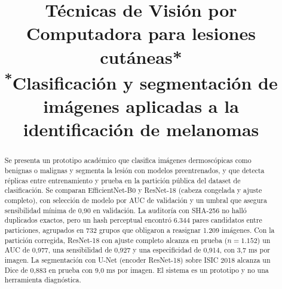 \documentclass[conference]{IEEEtran}
\begin{document}
	
	\title{Técnicas de Visión por Computadora para lesiones cutáneas*\\
		{\footnotesize \textsuperscript{*}Clasificación y segmentación de imágenes aplicadas a la identificación de melanomas}}
	
	\author{
		\and
		\and
		\and
	}
	
	\maketitle
	
	\begin{abstract}
		Se presenta un prototipo académico que clasifica imágenes dermoscópicas como benignas o malignas y segmenta la lesión con modelos preentrenados, y que detecta réplicas entre entrenamiento y prueba en la partición pública del dataset de clasificación. Se comparan EfficientNet-B0 y ResNet-18 (cabeza congelada y ajuste completo), con selección de modelo por AUC de validación y un umbral que asegura sensibilidad mínima de 0,90 en validación. La auditoría con SHA-256 no halló duplicados exactos, pero un hash perceptual encontró 6.344 pares candidatos entre particiones, agrupados en 732 grupos que obligaron a reasignar 1.209 imágenes. Con la partición corregida, ResNet-18 con ajuste completo alcanza en prueba ($n = 1.152$) un AUC de 0,977, una sensibilidad de 0,927 y una especificidad de 0,914, con 3,7 ms por imagen. La segmentación con U-Net (encoder ResNet-18) sobre ISIC 2018 alcanza un Dice de 0,883 en prueba con 9,0 ms por imagen. El sistema es un prototipo y no una herramienta diagnóstica.
	\end{abstract}
	
\end{document}

